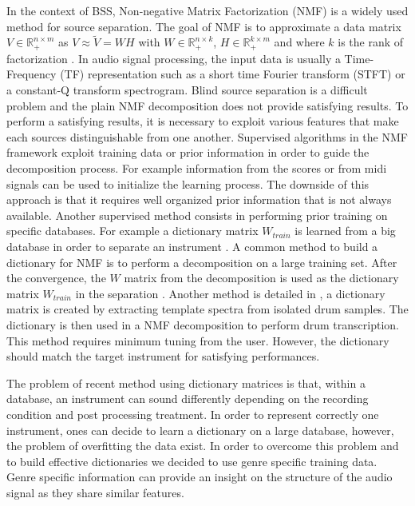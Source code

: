 \documentclass{article}
\begin{document}
In the context of BSS, Non-negative Matrix Factorization (NMF) is a widely used method for source separation. The goal of NMF is to approximate a data matrix $V \in \mathbb{R}_{+}^{n \times m} $ as $V \approx \tilde{V} = WH$ with $W \in \mathbb{R}_{+}^{n \times k}$, $H \in \mathbb{R}_{+}^{k \times m}$ and where $k$ is the rank of factorization \cite{lee99}. In audio signal processing, the input data is usually a Time-Frequency (TF) representation such as a short time Fourier transform (STFT) or a constant-Q transform spectrogram. Blind source separation is a difficult problem and the plain NMF decomposition does not provide satisfying results. To perform a satisfying results, it is necessary to exploit various features that make each sources distinguishable from one another. 
Supervised algorithms in the NMF framework exploit training data or prior information in order to guide the decomposition process. For example information from the scores or from midi signals \cite{EwertM12} can be used to initialize the learning process. The downside of this approach is that it requires well organized prior information that is not always available. Another supervised method consists in performing prior training on specific databases. For example a dictionary matrix $W_{train}$ is learned from a big database in order to separate an instrument \cite{jaureguiberry2011adaptation,wudrum}. A common method to build a dictionary for NMF is to perform a decomposition on a large training set. After the convergence, the $W$ matrix from the decomposition is used as the dictionary matrix $W_{train}$ in the separation \cite{jaureguiberry2011adaptation}. Another method is detailed in \cite{wudrum}, a dictionary matrix is created by extracting template spectra from isolated drum samples. The dictionary is then used in a NMF decomposition to perform drum transcription. This method requires minimum tuning from the user. However, the dictionary should match the target instrument for satisfying performances. 

The problem of recent method using dictionary matrices is that, within a database, an instrument can sound differently depending on the recording condition and post processing treatment. In order to represent correctly one instrument, ones can decide to learn a dictionary on a large database, however, the problem of overfitting the data exist. In order to overcome this problem and to build effective dictionaries we decided to use genre specific training data. Genre specific information can provide an insight on the structure of the audio signal as they share similar features.
\end{document}
